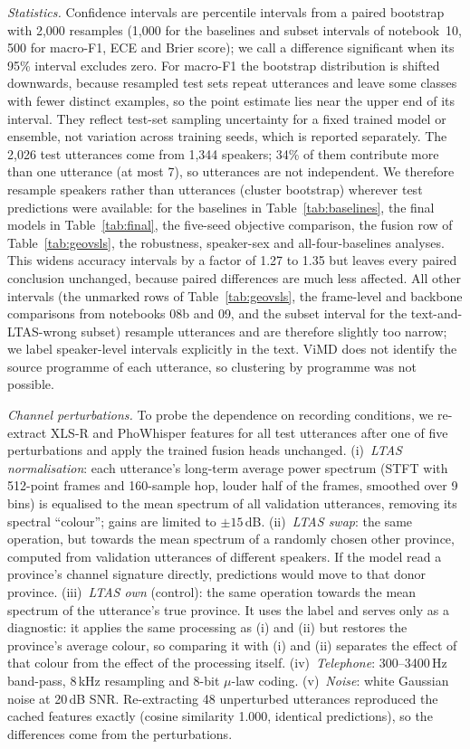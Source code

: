 \documentclass[conference]{IEEEtran}
\begin{document}
\textit{Statistics.} Confidence intervals are percentile intervals from a paired bootstrap with 2,000 resamples (1,000 for the baselines and subset intervals of notebook~10, 500 for macro-F1, ECE and Brier score); we call a difference significant when its 95\% interval excludes zero. For macro-F1 the bootstrap distribution is shifted downwards, because resampled test sets repeat utterances and leave some classes with fewer distinct examples, so the point estimate lies near the upper end of its interval. They reflect test-set sampling uncertainty for a fixed trained model or ensemble, not variation across training seeds, which is reported separately. The 2,026 test utterances come from 1,344 speakers; 34\% of them contribute more than one utterance (at most 7), so utterances are not independent. We therefore resample speakers rather than utterances (cluster bootstrap) wherever test predictions were available: for the baselines in Table~\ref{tab:baselines}, the final models in Table~\ref{tab:final}, the five-seed objective comparison, the fusion row of Table~\ref{tab:geovsls}, the robustness, speaker-sex and all-four-baselines analyses. This widens accuracy intervals by a factor of 1.27 to 1.35 but leaves every paired conclusion unchanged, because paired differences are much less affected. All other intervals (the unmarked rows of Table~\ref{tab:geovsls}, the frame-level and backbone comparisons from notebooks 08b and 09, and the subset interval for the text-and-LTAS-wrong subset) resample utterances and are therefore slightly too narrow; we label speaker-level intervals explicitly in the text. ViMD does not identify the source programme of each utterance, so clustering by programme was not possible.

\textit{Channel perturbations.} To probe the dependence on recording conditions, we re-extract XLS-R and PhoWhisper features for all test utterances after one of five perturbations and apply the trained fusion heads unchanged. (i)~\emph{LTAS normalisation}: each utterance's long-term average power spectrum (STFT with 512-point frames and 160-sample hop, louder half of the frames, smoothed over 9 bins) is equalised to the mean spectrum of all validation utterances, removing its spectral ``colour''; gains are limited to $\pm 15$\,dB. (ii)~\emph{LTAS swap}: the same operation, but towards the mean spectrum of a randomly chosen other province, computed from validation utterances of different speakers. If the model read a province's channel signature directly, predictions would move to that donor province. (iii)~\emph{LTAS own} (control): the same operation towards the mean spectrum of the utterance's true province. It uses the label and serves only as a diagnostic: it applies the same processing as (i) and (ii) but restores the province's average colour, so comparing it with (i) and (ii) separates the effect of that colour from the effect of the processing itself. (iv)~\emph{Telephone}: 300--3400\,Hz band-pass, 8\,kHz resampling and 8-bit $\mu$-law coding. (v)~\emph{Noise}: white Gaussian noise at 20\,dB SNR. Re-extracting 48 unperturbed utterances reproduced the cached features exactly (cosine similarity 1.000, identical predictions), so the differences come from the perturbations.
\end{document}
